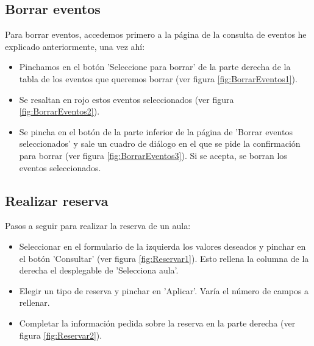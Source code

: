 \subsection{Borrar eventos}
Para borrar eventos, accedemos primero a la página de la consulta de eventos he explicado anteriormente, una vez ahí:
\begin{itemize}
    \item Pinchamos en el botón 'Seleccione para borrar' de la parte derecha de la tabla de los eventos que queremos borrar (ver figura \ref{fig:BorrarEventos1}).
    \item Se resaltan en rojo estos eventos seleccionados (ver figura \ref{fig:BorrarEventos2}).
    \item Se pincha en el botón de la parte inferior de la página de 'Borrar eventos seleccionados' y sale un cuadro de diálogo en el que se pide la confirmación para borrar (ver figura \ref{fig:BorrarEventos3}). Si se acepta, se borran los eventos seleccionados.
\end{itemize}

\subsection{Realizar reserva}
Pasos a seguir para realizar la reserva de un aula:
\begin{itemize}
    \item Seleccionar en el formulario de la izquierda los valores deseados y pinchar en el botón 'Consultar' (ver figura \ref{fig:Reservar1}). Esto rellena la columna de la derecha el desplegable de 'Selecciona aula'.
    \item Elegir un tipo de reserva y pinchar en 'Aplicar'. Varía el número de campos a rellenar.
    \item Completar la información pedida sobre la reserva en la parte derecha (ver figura \ref{fig:Reservar2}).
\end{itemize}

